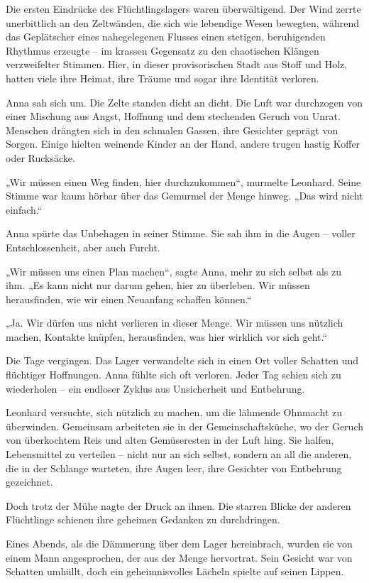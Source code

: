 \documentclass[
]{article}
\begin{document}
Die ersten Eindrücke des Flüchtlingslagers waren überwältigend. Der Wind zerrte unerbittlich an den Zeltwänden, die sich wie lebendige Wesen bewegten, während das Geplätscher eines nahegelegenen Flusses einen stetigen, beruhigenden Rhythmus erzeugte -- im krassen Gegensatz zu den chaotischen Klängen verzweifelter Stimmen. Hier, in dieser provisorischen Stadt aus Stoff und Holz, hatten viele ihre Heimat, ihre Träume und sogar ihre Identität verloren.

Anna sah sich um. Die Zelte standen dicht an dicht. Die Luft war durchzogen von einer Mischung aus Angst, Hoffnung und dem stechenden Geruch von Unrat. Menschen drängten sich in den schmalen Gassen, ihre Gesichter geprägt von Sorgen. Einige hielten weinende Kinder an der Hand, andere trugen hastig Koffer oder Rucksäcke.

„Wir müssen einen Weg finden, hier durchzukommen``, murmelte Leonhard. Seine Stimme war kaum hörbar über das Gemurmel der Menge hinweg. „Das wird nicht einfach.``

Anna spürte das Unbehagen in seiner Stimme. Sie sah ihm in die Augen -- voller Entschlossenheit, aber auch Furcht.

„Wir müssen uns einen Plan machen``, sagte Anna, mehr zu sich selbst als zu ihm. „Es kann nicht nur darum gehen, hier zu überleben. Wir müssen herausfinden, wie wir einen Neuanfang schaffen können.``

„Ja. Wir dürfen uns nicht verlieren in dieser Menge. Wir müssen uns nützlich machen, Kontakte knüpfen, herausfinden, was hier wirklich vor sich geht.``

Die Tage vergingen. Das Lager verwandelte sich in einen Ort voller Schatten und flüchtiger Hoffnungen. Anna fühlte sich oft verloren. Jeder Tag schien sich zu wiederholen -- ein endloser Zyklus aus Unsicherheit und Entbehrung.

Leonhard versuchte, sich nützlich zu machen, um die lähmende Ohnmacht zu überwinden. Gemeinsam arbeiteten sie in der Gemeinschaftsküche, wo der Geruch von überkochtem Reis und alten Gemüseresten in der Luft hing. Sie halfen, Lebensmittel zu verteilen -- nicht nur an sich selbst, sondern an all die anderen, die in der Schlange warteten, ihre Augen leer, ihre Gesichter von Entbehrung gezeichnet.

Doch trotz der Mühe nagte der Druck an ihnen. Die starren Blicke der anderen Flüchtlinge schienen ihre geheimen Gedanken zu durchdringen.

Eines Abends, als die Dämmerung über dem Lager hereinbrach, wurden sie von einem Mann angesprochen, der aus der Menge hervortrat. Sein Gesicht war von Schatten umhüllt, doch ein geheimnisvolles Lächeln spielte auf seinen Lippen.
\end{document}
